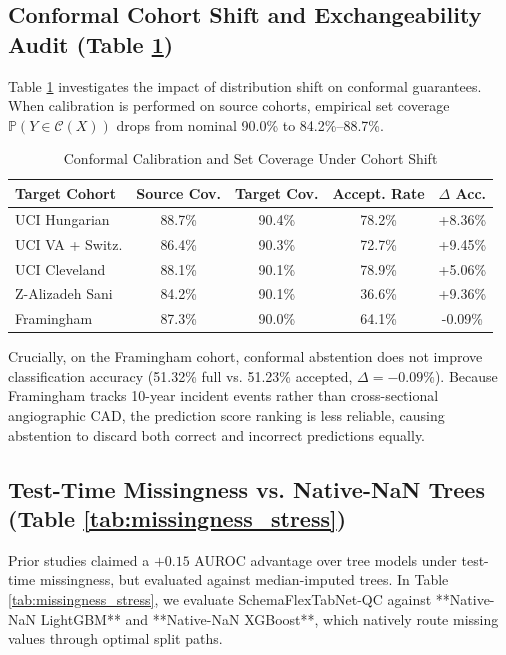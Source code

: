 \documentclass[journal]{IEEEtran}
\begin{document}
\subsection{Conformal Cohort Shift and Exchangeability Audit (Table \ref{tab:conformal_shift})}
Table \ref{tab:conformal_shift} investigates the impact of distribution shift on conformal guarantees. When calibration is performed on source cohorts, empirical set coverage $\mathbb{P}(Y \in \mathcal{C}(X))$ drops from nominal 90.0\% to 84.2\%--88.7\%.

\begin{table}[t]
\caption{Conformal Calibration and Set Coverage Under Cohort Shift}
\label{tab:conformal_shift}
\centering
\begin{tabular}{lcccc}
\toprule
\textbf{Target Cohort} & \textbf{Source Cov.} & \textbf{Target Cov.} & \textbf{Accept. Rate} & \textbf{$\Delta$ Acc.} \\
\midrule
UCI Hungarian    & 88.7\% & 90.4\% & 78.2\% & +8.36\% \\
UCI VA + Switz.  & 86.4\% & 90.3\% & 72.7\% & +9.45\% \\
UCI Cleveland    & 88.1\% & 90.1\% & 78.9\% & +5.06\% \\
Z-Alizadeh Sani  & 84.2\% & 90.1\% & 36.6\% & +9.36\% \\
Framingham       & 87.3\% & 90.0\% & 64.1\% & -0.09\% \\
\bottomrule
\end{tabular}
\end{table}

Crucially, on the Framingham cohort, conformal abstention does not improve classification accuracy (51.32\% full vs. 51.23\% accepted, $\Delta = -0.09\%$). Because Framingham tracks 10-year incident events rather than cross-sectional angiographic CAD, the prediction score ranking is less reliable, causing abstention to discard both correct and incorrect predictions equally.

\subsection{Test-Time Missingness vs. Native-NaN Trees (Table \ref{tab:missingness_stress})}
Prior studies claimed a $+0.15$ AUROC advantage over tree models under test-time missingness, but evaluated against median-imputed trees. In Table \ref{tab:missingness_stress}, we evaluate SchemaFlexTabNet-QC against **Native-NaN LightGBM** and **Native-NaN XGBoost**, which natively route missing values through optimal split paths.
\end{document}
